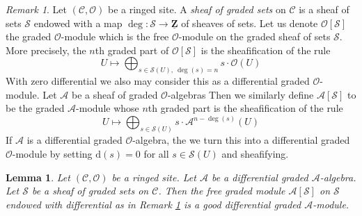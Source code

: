 \documentclass{stacks-project}
\theoremstyle{plain}
\newtheorem{lemma}[subsection]{Lemma}
\theoremstyle{definition}
\theoremstyle{remark}
\newtheorem{remark}[subsection]{Remark}
\numberwithin{equation}{subsection}
\begin{document}
\begin{remark}
\label{remark-sheaf-graded-sets}
Let $(\mathcal{C}, \mathcal{O})$ be a ringed site. A
{\it sheaf of graded sets} on $\mathcal{C}$ is a sheaf
of sets $\mathcal{S}$ endowed with a map
$\deg : \mathcal{S} \to \underline{\mathbf{Z}}$
of sheaves of sets. Let us denote $\mathcal{O}[\mathcal{S}]$
the graded $\mathcal{O}$-module which is the
free $\mathcal{O}$-module on the graded sheaf of sets $\mathcal{S}$.
More precisely, the $n$th graded part of
$\mathcal{O}[\mathcal{S}]$ is the sheafification of the rule
$$
U \longmapsto
\bigoplus\nolimits_{s \in \mathcal{S}(U),\ \deg(s) = n} s \cdot \mathcal{O}(U)
$$
With zero differential we also may consider this as a
differential graded $\mathcal{O}$-module.
Let $\mathcal{A}$ be a sheaf of graded $\mathcal{O}$-algebras
Then we similarly define $\mathcal{A}[\mathcal{S}]$ to be the
graded $\mathcal{A}$-module whose $n$th graded part is the
sheafification of the rule
$$
U \longmapsto
\bigoplus\nolimits_{s \in \mathcal{S}(U)} s \cdot \mathcal{A}^{n - \deg(s)}(U)
$$
If $\mathcal{A}$ is a differential graded $\mathcal{O}$-algebra, the
we turn this into a differential graded $\mathcal{O}$-module
by setting $\text{d}(s) = 0$ for all $s \in \mathcal{S}(U)$
and sheafifying.
\end{remark}

\begin{lemma}
\label{lemma-free-graded-module-good}
Let $(\mathcal{C}, \mathcal{O})$ be a ringed site.
Let $\mathcal{A}$ be a differential graded $\mathcal{A}$-algebra.
Let $\mathcal{S}$ be a sheaf of graded sets on $\mathcal{C}$.
Then the free graded module $\mathcal{A}[\mathcal{S}]$
on $\mathcal{S}$ endowed with differential as in
Remark \ref{remark-sheaf-graded-sets}
is a good differential graded $\mathcal{A}$-module.
\end{lemma}
\end{document}
